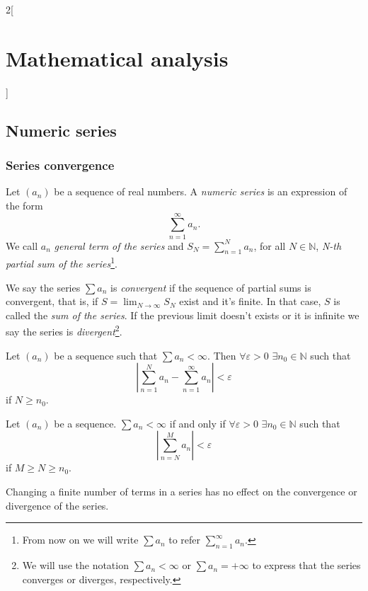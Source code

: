 \documentclass[class=article,crop=false]{standalone}
\begin{document}
\begin{multicols}{2}[\section{Mathematical analysis}]
\subsection{Numeric series}
\subsubsection*{Series convergence}
\begin{definition}
Let $(a_n)$ be a sequence of real numbers. A \textit{numeric series} is an expression of the form $$\sum_{n=1}^\infty a_n.$$ We call $a_n$ \textit{general term of the series} and $\displaystyle S_N=\sum_{n=1}^N a_n$, for all $N\in\mathbb{N}$, \textit{N-th partial sum of the series}\footnote{From now on we will write $\sum a_n$ to refer $\displaystyle\sum_{n=1}^\infty a_n$.}.
\end{definition}
\begin{definition}
We say the series $\sum a_n$ is \textit{convergent} if the sequence of partial sums is convergent, that is, if $\displaystyle S=\lim_{N\to\infty}S_N$ exist and it's finite. In that case, $S$ is called the \textit{sum of the series}. If the previous limit doesn't exists or it is infinite we say the series is \textit{divergent}\footnote{We will use the notation $\sum a_n<\infty$ or $\sum a_n=+\infty$ to express that the series converges or diverges, respectively.}.
\end{definition}
\begin{prop}
Let $(a_n)$ be a sequence such that $\sum a_n<\infty$. Then $\forall\varepsilon>0$ $\exists n_0\in\mathbb{N}$ such that $$\left|\sum_{n=1}^N a_n-\sum_{n=1}^\infty a_n\right|<\varepsilon$$ if $N\geq n_0$.
\end{prop}
\begin{theorem}
Let $(a_n)$ be a sequence. $\sum a_n<\infty$ if and only if $\forall\varepsilon>0$ $\exists n_0\in\mathbb{N}$ such that $$\left|\sum_{n=N}^Ma_n\right|<\varepsilon$$ if $M\geq N\geq n_0$.
\end{theorem}
\begin{corollary}
Changing a finite number of terms in a series has no effect on the convergence or divergence of the series.
\end{corollary}
\begin{corollary}

\end{corollary}
\end{multicols}
\end{document}
